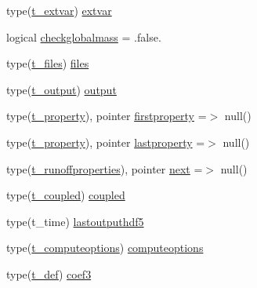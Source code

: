 \begin{DoxyCompactItemize}
type(\mbox{\hyperlink{structmodulerunoffproperties_1_1t__extvar}{t\+\_\+extvar}}) \mbox{\hyperlink{structmodulerunoffproperties_1_1t__runoffproperties_ac8d9de1a096f9a736fb13a865a609d38}{extvar}}
\item 
logical \mbox{\hyperlink{structmodulerunoffproperties_1_1t__runoffproperties_a25143316345067c00fe65946a462dd1e}{checkglobalmass}} = .false.
\item 
type(\mbox{\hyperlink{structmodulerunoffproperties_1_1t__files}{t\+\_\+files}}) \mbox{\hyperlink{structmodulerunoffproperties_1_1t__runoffproperties_a7e267221abb57b6ddb666c7a65371cc0}{files}}
\item 
type(\mbox{\hyperlink{structmodulerunoffproperties_1_1t__output}{t\+\_\+output}}) \mbox{\hyperlink{structmodulerunoffproperties_1_1t__runoffproperties_a619685861581fbc151715dd98607975d}{output}}
\item 
type(\mbox{\hyperlink{structmodulerunoffproperties_1_1t__property}{t\+\_\+property}}), pointer \mbox{\hyperlink{structmodulerunoffproperties_1_1t__runoffproperties_aeeeedb29f7595c4e10e7411c756dc034}{firstproperty}} =$>$ null()
\item 
type(\mbox{\hyperlink{structmodulerunoffproperties_1_1t__property}{t\+\_\+property}}), pointer \mbox{\hyperlink{structmodulerunoffproperties_1_1t__runoffproperties_aeaca330283d4d8aeaffafccf2b6abaa1}{lastproperty}} =$>$ null()
\item 
type(\mbox{\hyperlink{structmodulerunoffproperties_1_1t__runoffproperties}{t\+\_\+runoffproperties}}), pointer \mbox{\hyperlink{structmodulerunoffproperties_1_1t__runoffproperties_a7a2481a590609a7072052745eac6eb86}{next}} =$>$ null()
\item 
type(\mbox{\hyperlink{structmodulerunoffproperties_1_1t__coupled}{t\+\_\+coupled}}) \mbox{\hyperlink{structmodulerunoffproperties_1_1t__runoffproperties_ab5da8d2c011b47da1cb8d73d8f2ddbb8}{coupled}}
\item 
type(t\+\_\+time) \mbox{\hyperlink{structmodulerunoffproperties_1_1t__runoffproperties_a7b8d99c307455bfab89abc9f7e1552f2}{lastoutputhdf5}}
\item 
type(\mbox{\hyperlink{structmodulerunoffproperties_1_1t__computeoptions}{t\+\_\+computeoptions}}) \mbox{\hyperlink{structmodulerunoffproperties_1_1t__runoffproperties_a9b5ac1759b06f5aec4816a0f0547ff40}{computeoptions}}
\item 
type(\mbox{\hyperlink{structmodulerunoffproperties_1_1t__def}{t\+\_\+def}}) \mbox{\hyperlink{structmodulerunoffproperties_1_1t__runoffproperties_a82a6dec932e7b7543569e327005b01d6}{coef3}}

\end{DoxyCompactItemize}
